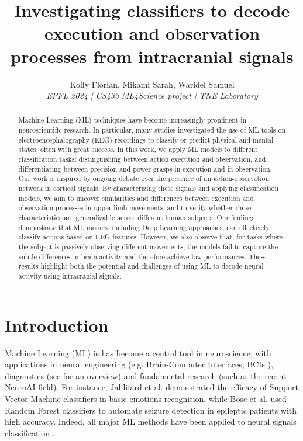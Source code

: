 \documentclass[10pt,conference,compsocconf]{IEEEtran}
\begin{document}
\title{Investigating classifiers to decode execution and observation processes from intracranial signals}

\author{
  Kolly Florian, Mikami Sarah, Waridel Samuel \\
  \textit{EPFL 2024 | CS433}
  \textit{ML4Science project | TNE Laboratory}
}

\maketitle

\begin{abstract}
    Machine Learning (ML) techniques have become increasingly prominent in neuroscientific research. In particular, many studies investigated the use of ML tools on electroencephalography (EEG) recordings to classify or predict physical and mental states, often with great success. In this work, we apply ML models to different classification tasks: distinguishing between action execution and observation, and differentiating between precision and power grasps in execution and in observation. Our work is inspired by ongoing debate over the presence of an action-observation network in cortical signals. By characterizing these signals and applying classification models, we aim to uncover similarities and differences between execution and observation processes in upper limb movements, and to verify whether those characteristics are generalizable across different human subjects. Our findings demonstrate that ML models, including Deep Learning approaches, can effectively classify actions based on EEG features. However, we also observe that, for tasks where the subject is passively observing different movements, the models fail to capture the subtle differences in brain activity and therefore achieve low performances. These results highlight both the potential and challenges of using ML to decode neural activity using intracranial signals.
\end{abstract}

\section{Introduction}
Machine Learning (ML) is has become a central tool in neuroscience, with applications in neural engineering (e.g. Brain-Computer Interfaces, BCIs \cite{eegforbci}), diagnostics (see \cite{VIEIRA201758} for an overview) and fundamental research (such as the recent NeuroAI field). For instance, Jalilifard et al. \cite{EmotionClassificationSVM} demonstrated the efficacy of Support Vector Machine classifiers in basic emotions recognition, while Bose et al. \cite{EEGRandomForset} used Random Forest classifiers to automate seizure detection in epileptic patients with high accuracy. Indeed, all major ML methods have been applied to neural signals classification \cite{EEGMLReview}.
\end{document}
